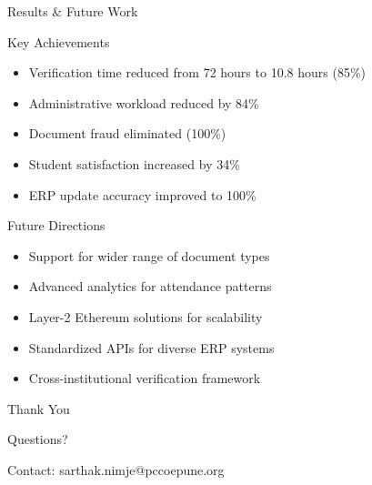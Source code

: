 \documentclass{beamer}
\begin{document}
\begin{frame}{Results \& Future Work}
\begin{block}{Key Achievements}
\begin{itemize}
    \item Verification time reduced from 72 hours to 10.8 hours (85\%)
    \item Administrative workload reduced by 84\%
    \item Document fraud eliminated (100\%)
    \item Student satisfaction increased by 34\%
    \item ERP update accuracy improved to 100\%
\end{itemize}
\end{block}

\begin{block}{Future Directions}
\begin{itemize}
    \item Support for wider range of document types
    \item Advanced analytics for attendance patterns
    \item Layer-2 Ethereum solutions for scalability
    \item Standardized APIs for diverse ERP systems
    \item Cross-institutional verification framework
\end{itemize}
\end{block}
\end{frame}

\begin{frame}{Thank You}
\begin{center}
\Huge{Questions?}

\vspace{1cm}
\normalsize
Contact: sarthak.nimje@pccoepune.org
\end{center}
\end{frame}
\end{document}
